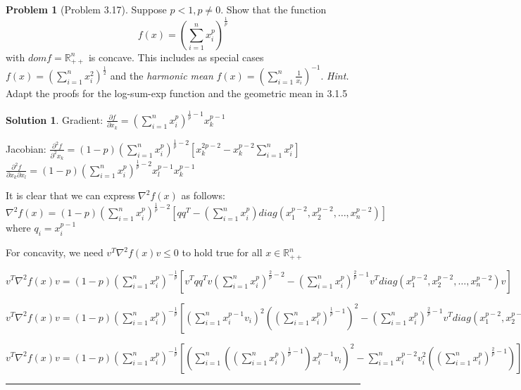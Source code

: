 \documentclass{article}
\theoremstyle{definition}
\newtheorem{problem}{Problem}
\def\fline{\rule{0.75\linewidth}{0.5pt}}
\newcommand{\finishline}{\begin{center}\fline\end{center}}
\newtheorem*{solution*}{Solution}
\newenvironment{solution}{\begin{solution*}}{{\finishline} \end{solution*}}
\begin{document}
\begin{problem} [Problem 3.17]
Suppose $p < 1, p \neq 0$. Show that the function 
\begin{equation}
    f(x) = (\sum_{i=1}^{n} x_i^p)^{\frac{1}{p}}
\end{equation}
with $dom f = \mathbb{R}^n_{++}$ is concave. This includes as special cases $f(x) = (\sum_{i=1}^{n} x_i^2)^{\frac{1}{2}}$ and the \textit{harmonic mean} $f(x) = (\sum_{i=1}^{n} \frac{1}{x_i})^{-1}$. \textit{Hint.} Adapt the proofs for the log-sum-exp
function and the geometric mean in 3.1.5

\begin{solution}
    Gradient: $\frac{\partial{f}}{\partial{x_k}} = (\sum_{i=1}^{n} x_i^p)^{\frac{1}{p} - 1} x_k^{p - 1}$

    Jacobian: \newline 
    $\frac{\partial^2{f}}{\partial^2{x_k}} = (1 - p) (\sum_{i=1}^{n} x_i^p)^{\frac{1}{p} - 2} [x_k^{2p - 2} - x_k^{p - 2} \sum_{i=1}^{n} x_i^p]$ \newline 
    $\frac{\partial^2{f}}{\partial{x_k} \partial{x_l}} = (1 - p) (\sum_{i=1}^{n} x_i^p)^{\frac{1}{p} - 2} x_l^{p - 1} x_k^{p - 1}$ \newline 

    It is clear that we can express $\nabla^2f(x)$ as follows: \newline 
    $\nabla^2f(x) = (1 - p) (\sum_{i=1}^{n} x_i^p)^{\frac{1}{p} - 2} [qq^T - (\sum_{i=1}^{n} x_i^p) diag(x_1^{p - 2}, x_2^{p - 2}, \dots, x_n^{p - 2})]$ where $q_i = x_i^{p - 1}$ \newline 

    For concavity, we need $v^T \nabla^2f(x) v \leq 0$ to hold true for all $x \in \mathbb{R}^n_{++}$

    $v^T \nabla^2f(x) v  = (1 - p) (\sum_{i=1}^{n} x_i^p)^{-\frac{1}{p}} [v^Tqq^Tv (\sum_{i=1}^{n} x_i^p)^{\frac{2}{p} - 2} - (\sum_{i=1}^{n} x_i^p)^{\frac{2}{p} - 1} v^T diag(x_1^{p - 2}, x_2^{p - 2}, \dots, x_n^{p - 2}) v]$

    $v^T \nabla^2f(x) v  = (1 - p) (\sum_{i=1}^{n} x_i^p)^{-\frac{1}{p}} [(\sum_{i=1}^{n} x_i^{p - 1} v_i)^2 ((\sum_{i=1}^{n} x_i^p)^{\frac{1}{p} - 1})^2 - (\sum_{i=1}^{n} x_i^p)^{\frac{2}{p} - 1} v^T diag(x_1^{p - 2}, x_2^{p - 2}, \dots, x_n^{p - 2}) v]$

    $v^T \nabla^2f(x) v  = (1 - p) (\sum_{i=1}^{n} x_i^p)^{-\frac{1}{p}} [(\sum_{i=1}^{n} ((\sum_{i=1}^{n} x_i^p)^{\frac{1}{p} - 1}) x_i^{p - 1} v_i)^2  - \sum_{i=1}^{n} x_i^{p - 2} v_i^2 ((\sum_{i=1}^{n} x_i^p)^{\frac{2}{p} - 1})]$



\end{solution}
\end{problem}
\end{document}
